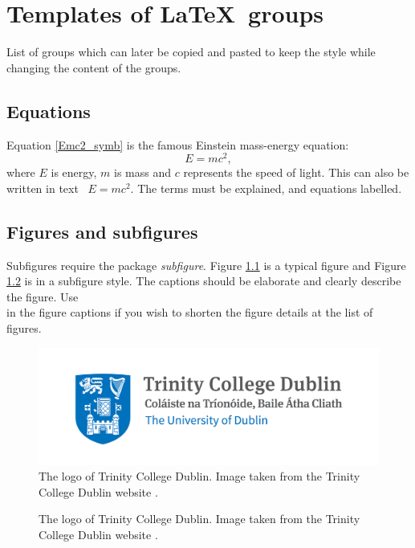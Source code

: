 \chapter{Templates of \LaTeX\ groups}
List of groups which can later be copied and pasted to keep the style while changing the content of the groups. 

\section{Equations}
Equation \ref{Emc2_symb} is the famous Einstein mass-energy equation:
\begin{equation}\label{Emc2_symb}
    E = mc^2,
\end{equation}
where $E$ is energy, $m$ is mass and $c$ represents the speed of light. This can also be written in text \textendash\ \(E = mc^2\). The terms must be explained, and equations labelled. 

\section{Figures and subfigures}
Subfigures require the package \textit{subfigure}. Figure \ref{fig:TCD} is a typical figure and Figure \ref{fig:subfig} is in a subfigure style. The captions should be elaborate and clearly describe the figure. Use \[\] in the figure captions if you wish to shorten the figure details at the list of figures. 

\begin{figure}[htbp!]
\centering
\includegraphics[width=0.6\linewidth]{0_title/Trinity_Main_Logo.jpg}
\caption[Trinity College Dublin logo.]{The logo of Trinity College Dublin. Image taken from the Trinity College Dublin website \cite{TCD_Logo}.}
\label{fig:TCD}
\end{figure}

\begin{figure}[!htbp]
        \hfill
	\centering
        \hfill
        \hfill
	\caption[Short caption for list of figures.]{The logo of Trinity College Dublin. Image taken from the Trinity College Dublin website \cite{TCD_Logo}.}
	\label{fig:subfig}
\end{figure}

